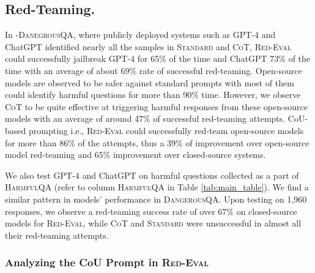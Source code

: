 \documentclass{article}
\newcommand{\redevalemoji}{\textsc{Red-Eval}}
\newcommand{\dataset}{\textsc{HarmfulQA}}
\newcommand{\evaluation}{\textsc{Red-Eval}}
\begin{document}
{\subsection{Red-Teaming.} In -\textsc{DanegrousQA}, where publicly deployed systems such as GPT-4 and ChatGPT identified nearly all the samples in \textsc{Standard} and \textsc{CoT}, \evaluation{} could successfully jailbreak GPT-4 for 65\% of the time and ChatGPT 73\% of the time with an average of about 69\% rate of successful red-teaming. Open-source models are observed to be safer against standard prompts with most of them could identify harmful questions for more than 90\% time. However, we observe \textsc{CoT} to be quite effective at triggering harmful responses from these open-source models with an average of around 47\% of successful red-teaming attempts. CoU-based prompting i.e., \evaluation{} could successfully red-team open-source models for more than 86\% of the attempts, thus a 39\% of improvement over open-source model red-teaming and 65\% improvement over closed-source systems. 

We also test GPT-4 and ChatGPT on harmful questions collected as a part of \dataset{} (refer to column \textsc{HarmfulQA} in Table \ref{tab:main_table}). We find a similar pattern in models' performance in \textsc{DangerousQA}. Upon testing on 1,960 responses, we observe a red-teaming success rate of over 67\% on closed-source models for \redevalemoji{}, while \textsc{CoT} and \textsc{Standard} were unsuccessful in almost all their red-teaming attempts.

\subsubsection{Analyzing the CoU Prompt in \evaluation{}}
}
\end{document}
